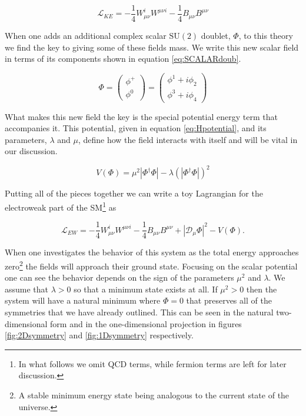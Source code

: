 \begin{equation}
\label{eq:EW_KE}
\mathscr{L}_{KE} = -\frac{1}{4}W_{\mu \nu}^{i}W^{\mu \nu i} - \frac{1}{4}B_{\mu \nu}B^{\mu \nu}
\end{equation}

When one adds an additional complex scalar $\mathrm{SU}(2)$ doublet, $\Phi$, to this theory we find the key to giving some of these fields mass. We write this new scalar field in terms of its components shown in equation \eqref{eq:SCALARdoub}.

\begin{equation}
\label{eq:SCALARdoub}
\Phi = \begin{pmatrix} \phi^{+} \\ \phi^{0} \end{pmatrix} = \begin{pmatrix} \phi^{1} + i\phi_{2} \\ \phi^{3} + i\phi_{4} \end{pmatrix}
\end{equation}

What makes this new field the key is the special potential energy term that accompanies it. This potential, given in equation \eqref{eq:Hpotential}, and its parameters, $\lambda$ and $\mu$, define how the field interacts with itself and will be vital in our discussion.

\begin{equation}
\label{eq:Hpotential}
V\left(\Phi\right) = \mu^{2}\left|\Phi^{\dagger}\Phi\right| - \lambda\left(\left|\Phi^{\dagger}\Phi\right|\right)^{2}
\end{equation}

Putting all of the pieces together we can write a toy Lagrangian for the electroweak part of the SM\footnote{In what follows we omit QCD terms, while fermion terms are left for later discussion.} as

\begin{equation}
\label{eq:EWsector}
\mathscr{L}_{EW} = -\frac{1}{4}W_{\mu \nu}^{i}W^{\mu \nu i} - \frac{1}{4}B_{\mu \nu}B^{\mu \nu} + \left|\mathcal{D}_{\mu}\Phi\right|^{2} - V\left(\Phi\right).
\end{equation}

When one investigates the behavior of this system as the total energy approaches zero\footnote{A stable minimum energy state being analogous to the current state of the universe.} the fields will approach their ground state. Focusing on the scalar potential one can see the behavior depends on the sign of the parameters $\mu^{2}$ and $\lambda$. We assume that $\lambda > 0$ so that a minimum state exists at all. If $\mu^2 > 0$ then the system will have a natural minimum where $\Phi = 0$ that preserves all of the symmetries that we have already outlined. This can be seen in the natural two-dimensional form and in the one-dimensional projection in figures \ref{fig:2Dsymmetry} and \ref{fig:1Dsymmetry} respectively. 


